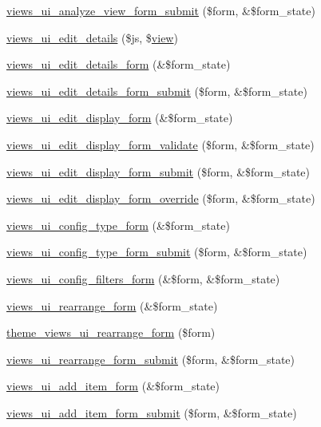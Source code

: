 \begin{CompactItemize}
\hyperlink{admin_8inc_a1090e8a74ff37716f6b2365f188c73b}{views\_\-ui\_\-analyze\_\-view\_\-form\_\-submit} (\$form, \&\$form\_\-state)
\item 
\hyperlink{admin_8inc_44a59c2c2496856a1665b0a1351dbafc}{views\_\-ui\_\-edit\_\-details} (\$js, \$\hyperlink{classview}{view})
\item 
\hyperlink{admin_8inc_6d4b9deaef5d0ec9fc6a5185e88f6573}{views\_\-ui\_\-edit\_\-details\_\-form} (\&\$form\_\-state)
\item 
\hyperlink{admin_8inc_674154b3d2a6a378f121ec2f0a66d52c}{views\_\-ui\_\-edit\_\-details\_\-form\_\-submit} (\$form, \&\$form\_\-state)
\item 
\hyperlink{admin_8inc_f6122919e9513646e5dfeba97114ee35}{views\_\-ui\_\-edit\_\-display\_\-form} (\&\$form\_\-state)
\item 
\hyperlink{admin_8inc_a266b14e787266b24a7096f58d41667c}{views\_\-ui\_\-edit\_\-display\_\-form\_\-validate} (\$form, \&\$form\_\-state)
\item 
\hyperlink{admin_8inc_2272bcea1334751c9c2e8d6b04ae64af}{views\_\-ui\_\-edit\_\-display\_\-form\_\-submit} (\$form, \&\$form\_\-state)
\item 
\hyperlink{admin_8inc_5d8a67bc769fcccdad46636e063079d2}{views\_\-ui\_\-edit\_\-display\_\-form\_\-override} (\$form, \&\$form\_\-state)
\item 
\hyperlink{admin_8inc_bbebaee3c929f00492cf42bd8cb8db46}{views\_\-ui\_\-config\_\-type\_\-form} (\&\$form\_\-state)
\item 
\hyperlink{admin_8inc_61be3ab41a05febb0ec4c994beaf0b69}{views\_\-ui\_\-config\_\-type\_\-form\_\-submit} (\$form, \&\$form\_\-state)
\item 
\hyperlink{admin_8inc_94ed7bd014dce1a7f7f728fa6790e3f0}{views\_\-ui\_\-config\_\-filters\_\-form} (\&\$form, \&\$form\_\-state)
\item 
\hyperlink{admin_8inc_ed46401ae2bf055dc722299e6f041b9b}{views\_\-ui\_\-rearrange\_\-form} (\&\$form\_\-state)
\item 
\hyperlink{admin_8inc_45a823b50e25c9050b2d28a5eb53c023}{theme\_\-views\_\-ui\_\-rearrange\_\-form} (\$form)
\item 
\hyperlink{admin_8inc_6cc534f5a5904b1b21333fb063836be7}{views\_\-ui\_\-rearrange\_\-form\_\-submit} (\$form, \&\$form\_\-state)
\item 
\hyperlink{admin_8inc_c391db5551c2725f1c483ea09bc6551a}{views\_\-ui\_\-add\_\-item\_\-form} (\&\$form\_\-state)
\item 
\hyperlink{admin_8inc_b9af88d70446a68c6fac8afe2bc4cffe}{views\_\-ui\_\-add\_\-item\_\-form\_\-submit} (\$form, \&\$form\_\-state)

\end{CompactItemize}

